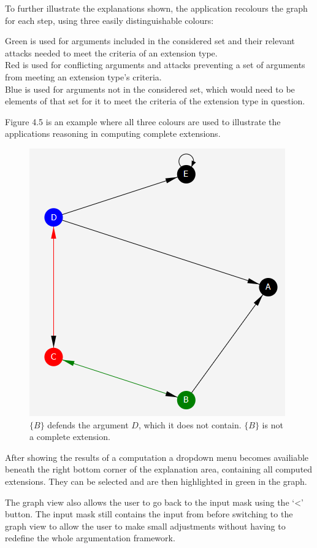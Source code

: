 \documentclass[draft,final]{vutinfth} %
\newcommand{\hl}{\par\vspace{6pt}} %
\begin{document}
To further illustrate the explanations shown, the application recolours the graph for each step, using three easily distinguishable colours:\hl
Green is used for arguments included in the considered set and their relevant attacks needed to meet the criteria of an extension type.\\
Red is used for conflicting arguments and attacks preventing a set of arguments from meeting an extension type's criteria.\\
Blue is used for arguments not in the considered set, which would need to be elements of that set for it to meet the criteria of the extension type in question.\hl
Figure 4.5 is an example where all three colours are used to illustrate the applications reasoning in computing complete extensions.\hl

\FloatBarrier
	\begin{figure}[!h]
		\centering
		\includegraphics{pics/missing.png}
		\caption[Highlighting of nodes and edges in a graph]{$\{B\}$ defends the argument $D$, which it does not contain. $\{B\}$ is not a complete extension.}
	\end{figure}
\FloatBarrier

After showing the results of a computation a dropdown menu becomes availiable beneath the right bottom corner of the explanation area, containing all computed extensions. They can be selected and are then highlighted in green in the graph.\hl
The graph view also allows the user to go back to the input mask using the `<' button. The input mask still contains the input from before switching to the graph view to allow the user to make small adjustments without having to redefine the whole argumentation framework.
\end{document}

